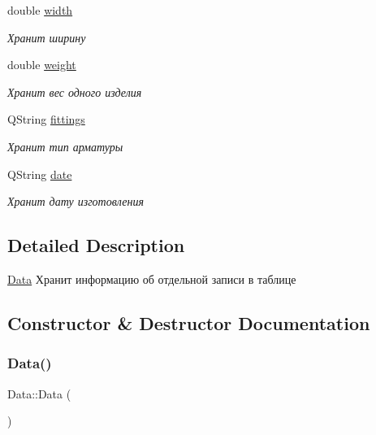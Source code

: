 \begin{DoxyCompactItemize}
double \mbox{\hyperlink{class_data_ae7a24cb64fc28f87f3b2cd1b0a447d25}{width}}
\begin{DoxyCompactList}\small\item\em Хранит ширину \end{DoxyCompactList}\item 
\mbox{\label{class_data_a6c25bf523edd42b47dd8495307273594}} 
double \mbox{\hyperlink{class_data_a6c25bf523edd42b47dd8495307273594}{weight}}
\begin{DoxyCompactList}\small\item\em Хранит вес одного изделия \end{DoxyCompactList}\item 
\mbox{\label{class_data_a4d9e20ab733af7e52714c7e817c8f69c}} 
Q\+String \mbox{\hyperlink{class_data_a4d9e20ab733af7e52714c7e817c8f69c}{fittings}}
\begin{DoxyCompactList}\small\item\em Хранит тип арматуры \end{DoxyCompactList}\item 
\mbox{\label{class_data_ab4fdaff8b80270296a56be3702b5260d}} 
Q\+String \mbox{\hyperlink{class_data_ab4fdaff8b80270296a56be3702b5260d}{date}}
\begin{DoxyCompactList}\small\item\em Хранит дату изготовления \end{DoxyCompactList}\end{DoxyCompactItemize}


\subsection{Detailed Description}
\mbox{\hyperlink{class_data}{Data}} Хранит информацию об отдельной записи в таблице 

\subsection{Constructor \& Destructor Documentation}
\mbox{\label{class_data_af11f741cb7f587e2e495452a8905a22a}} 
\subsubsection{\texorpdfstring{Data()}{Data()}}
{\footnotesize\ttfamily Data\+::\+Data (\begin{DoxyParamCaption}{ }\end{DoxyParamCaption})}

